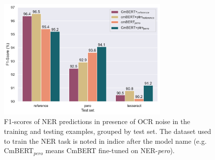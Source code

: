 \begin{figure}
    \centering
    \includegraphics[width=0.75\textwidth]{images/experiment_2_f1_with_noise_graph.pdf}
    \caption{\label{fig:exp_2_eval_ner}F1-scores of NER predictions in presence of OCR noise in the training and testing examples, grouped by test set. The dataset used to train the NER task is noted in indice after the model name (e.g. CmBERT$_{pero}$ means CmBERT fine-tuned on NER-\emph{pero}).}
\end{figure}


